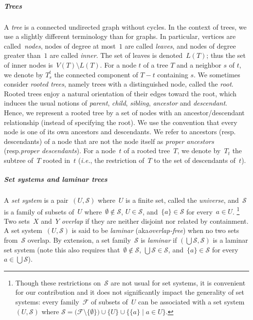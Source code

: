 \documentclass{lmcs} %
\newcommand*\defd[2][\em\color{red!25!black}]{{#1#2}}
\newcommand{\resp}{resp.\xspace}
\newcommand{\aka}{aka\xspace}
\def\ie{{\em i.e.}}
\begin{document}
\subparagraph{Trees}
A \defd{tree} is a connected undirected graph without cycles.
In the context of trees,
we use a slightly different terminology than for graphs.
In particular, vertices are called~\defd{nodes},
nodes of degree at most~$1$ are called \defd{leaves},
and nodes of degree greater than~$1$ are called \defd{inner}.
The set of leaves is denoted~\defd{$L(T)$};
thus the set of inner nodes is~$V(T)\setminus L(T)$. For a node $t$ of a tree $T$ and a neighbor $s$ of $t$, we denote by $T^t_s$ the connected component of $T-t$ containing $s$.
We sometimes consider \defd{rooted trees},
namely trees with a distinguished node, called the \defd{root}.
Rooted trees enjoy a natural orientation of their edges
toward the root,
which induces the usual notions of
\defd{parent}, \defd{child}, \defd{sibling}, \defd{ancestor} and \defd{descendant}.
Hence, we represent a rooted tree by a set of nodes with an ancestor/descendant relationship (instead of specifying the root).
We use the convention that every node is one of its own ancestors and descendants.
We refer to ancestors (\resp descendants) of a node
that are not the node itself
as \defd{proper ancestors} (\resp \defd{proper descendants}).
For a node~$t$ of a rooted tree~$T$,
we denote by~\defd{$T_t$} the subtree of~$T$ rooted in~$t$
(\ie, the restriction of~$T$ to the set of descendants of~$t$).


\subparagraph{Set systems and laminar trees}
A \defd{set system} is a pair~$(U,\mathcal{S})$
where~$U$ is a finite set, called the \defd{universe},
and~$\mathcal{S}$ is a family of subsets of~$U$
where~$\emptyset\notin\mathcal{S}$,
$U\in\mathcal{S}$,
and~$\{a\}\in\mathcal{S}$ for every~$a\in U$.%
\footnote{%
    Though these restrictions on~$\mathcal{S}$ are not usual for set systems,
    it is convenient for our contribution
    and it does not significantly impact the generality of set systems:
    every family~$\mathcal{F}$ of subsets of~$U$
    can be associated with a set system~$(U,\mathcal{S})$
    where $\mathcal{S}=\big(\mathcal{F}\setminus\{\emptyset\}\big)\cup\big\{U\big\}\cup\big\{ \{a\} \mid a\in U\big\}$.%
}
Two sets~$X$ and~$Y$ \defd{overlap}
if they are neither disjoint nor related by containment.
A set system~$(U,\mathcal{S})$
is said to be \defd{laminar} (\aka \emph{overlap-free})
when no two sets from~$\mathcal{S}$ overlap.
By extension, a set family~$\mathcal{S}$ is \defd{laminar}
if $\left(\bigcup\mathcal{S}, \mathcal{S}\right)$ is a laminar set system
(note this also requires that~$\emptyset\notin\mathcal{S}$, $\bigcup\mathcal{S}\in\mathcal{S}$, and~$\{a\}\in\mathcal{S}$ for every~$a\in\bigcup\mathcal{S}$).
\end{document}
